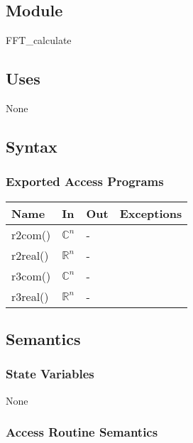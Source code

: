 \documentclass[12pt, titlepage]{article}
\begin{document}
\subsection{Module}

FFT\_calculate

\subsection{Uses}
None
\subsection{Syntax}

\subsubsection{Exported Access Programs}

\begin{center}
\begin{tabular}{p{2cm} p{4cm} p{4cm} p{2cm}}
\hline
\textbf{Name} & \textbf{In} & \textbf{Out} & \textbf{Exceptions} \\
\hline
r2com() &$\mathbb{C}^ n$& - & \\
r2real()&$\mathbb{R}^ n$ & - & \\
r3com()&$\mathbb{C}^ n$ & - & \\
r3real()&$\mathbb{R}^ n$& -&\\

\hline
\end{tabular}
\end{center}

\subsection{Semantics}


\subsubsection{State Variables}
None

\subsubsection{Access Routine Semantics}
\end{document}
